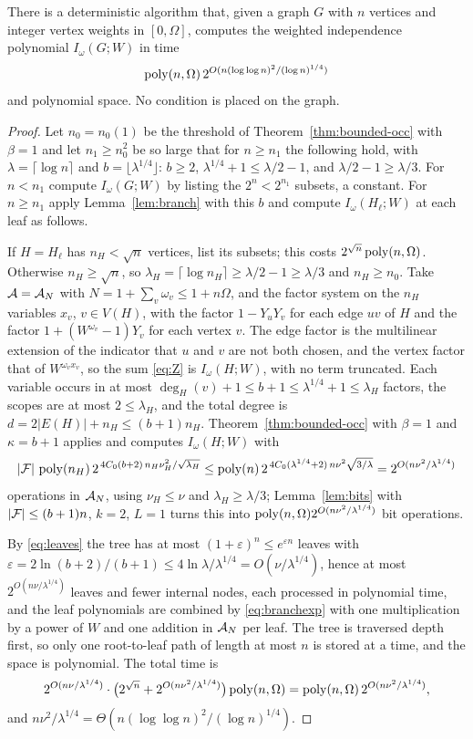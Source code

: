 \begin{theorem}\label{thm:indep}
There is a deterministic algorithm that, given a graph $G$ with $n$ vertices and
integer vertex weights in $[0,\Omega]$, computes the weighted independence
polynomial $I_\omega(G;W)$ in time
\[
  \operatorname{poly}(n,\Omega)\,2^{O(n(\log\log n)^2/(\log n)^{1/4})}
\]
and polynomial space. No condition is placed on the graph.
\end{theorem}

\begin{proof}
Let $n_0=n_0(1)$ be the threshold of Theorem~\ref{thm:bounded-occ} with $\beta=1$
and let $n_1\ge n_0^2$ be so large that for $n\ge n_1$ the following hold, with
$\lambda=\lceil\log n\rceil$ and $b=\lfloor\lambda^{1/4}\rfloor$: $b\ge2$,
$\lambda^{1/4}+1\le\lambda/2-1$, and $\lambda/2-1\ge\lambda/3$. For $n<n_1$
compute $I_\omega(G;W)$ by listing the $2^{n}<2^{n_1}$ subsets, a constant. For
$n\ge n_1$ apply Lemma~\ref{lem:branch} with this $b$ and compute
$I_\omega(H_\ell;W)$ at each leaf as follows.

If $H=H_\ell$ has $n_H<\sqrt n$ vertices, list its subsets; this costs
$2^{\sqrt n}\operatorname{poly}(n,\Omega)$. Otherwise $n_H\ge\sqrt n$, so
$\lambda_H=\lceil\log n_H\rceil\ge\lambda/2-1\ge\lambda/3$ and $n_H\ge n_0$. Take
$\mathcal{A}=\mathcal{A}_N$ with $N=1+\sum_v\omega_v\le1+n\Omega$, and the factor system on the
$n_H$ variables $x_v$, $v\in V(H)$, with the factor $1-Y_uY_v$ for each edge
$uv$ of $H$ and the factor $1+(W^{\omega_v}-1)Y_v$ for each vertex $v$. The
edge factor is the multilinear extension of the indicator that $u$ and $v$ are
not both chosen, and the vertex factor that of $W^{\omega_vx_v}$, so the sum
\eqref{eq:Z} is $I_\omega(H;W)$, with no term truncated. Each variable occurs in
at most $\deg_H(v)+1\le b+1\le\lambda^{1/4}+1\le\lambda_H$ factors, the scopes are
at most $2\le\lambda_H$, and the total degree is
$d=2|E(H)|+n_H\le(b+1)n_H$. Theorem~\ref{thm:bounded-occ} with $\beta=1$ and
$\kappa=b+1$ applies and computes $I_\omega(H;W)$ with
\[
  |\mathcal{F}|\,\operatorname{poly}(n_H)\,2^{\,4C_0(b+2)\,n_H\nu_H^2/\sqrt{\lambda_H}}
  \le\operatorname{poly}(n)\,2^{\,4C_0(\lambda^{1/4}+2)\,n\nu^2\sqrt{3/\lambda}}
  =2^{O(n\nu^2/\lambda^{1/4})}
\]
operations in $\mathcal{A}_N$, using $\nu_H\le\nu$ and $\lambda_H\ge\lambda/3$;
Lemma~\ref{lem:bits} with $|\mathcal{F}|\le(b+1)n$, $k=2$, $L=1$ turns this into
$\operatorname{poly}(n,\Omega)2^{O(n\nu^2/\lambda^{1/4})}$ bit operations.

By \eqref{eq:leaves} the tree has at most $(1+\varepsilon)^n\le e^{\varepsilon n}$
leaves with $\varepsilon=2\ln(b+2)/(b+1)\le 4\ln\lambda/\lambda^{1/4}=O(\nu/\lambda^{1/4})$,
hence at most $2^{O(n\nu/\lambda^{1/4})}$ leaves and fewer internal nodes, each
processed in polynomial time, and the leaf polynomials are combined by
\eqref{eq:branchexp} with one multiplication by a power of $W$ and one addition
in $\mathcal{A}_N$ per leaf. The tree is traversed depth first, so only one root-to-leaf
path of length at most $n$ is stored at a time, and the space is polynomial. The
total time is
\[
  2^{O(n\nu/\lambda^{1/4})}\cdot\bigl(2^{\sqrt n}+2^{O(n\nu^2/\lambda^{1/4})}\bigr)\operatorname{poly}(n,\Omega)
  =\operatorname{poly}(n,\Omega)\,2^{O(n\nu^2/\lambda^{1/4})},
\]
and $n\nu^2/\lambda^{1/4}=\Theta(n(\log\log n)^2/(\log n)^{1/4})$.
\end{proof}

